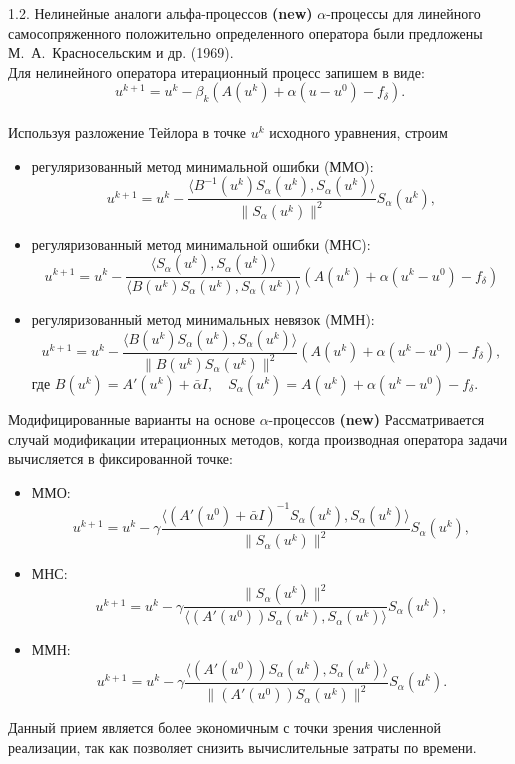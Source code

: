 \documentclass[10pt,pdf, mathserif, hyperref={unicode}]{beamer}
\begin{document}
\begin{frame}{1.2. Нелинейные аналоги альфа-процессов \textbf{(new)}}
	$\alpha$-процессы для линейного  самосопряженного положительно определенного оператора  были предложены {\color{red}М.~А.~Красносельским и др. (1969)}. \\
	Для нелинейного оператора итерационный процесс запишем в виде:
	$$u^{k+1}=u^k-\beta_k(A(u^k)+\alpha(u-u^0)-f_{\delta}).$$ \\
	Используя разложение Тейлора в точке $u^k$ исходного уравнения, строим
	\begin{itemize}
		\item регуляризованный метод минимальной ошибки (ММО): $$u^{k+1} =u^k - \frac{\langle B^{-1}(u^k)S_\alpha(u^k), S_\alpha (u^k)\rangle}{\|S_\alpha(u^k)\|^2}S_\alpha(u^k),$$
		\item регуляризованный метод минимальной ошибки (МНС):
		$$u^{k+1} =u^k - \frac{\langle S_\alpha(u^k), S_\alpha (u^k)\rangle}{\langle B(u^k)S_\alpha(u^k), S_\alpha(u^k)\rangle}(A(u^k)+\alpha(u^k-u^0)-f_\delta)$$
		\item регуляризованный метод минимальных невязок (ММН):
		$$u^{k+1} =u^k - \frac{\langle B(u^k)S_\alpha(u^k), S_\alpha (u^k)\rangle}{\|B(u^k)S_\alpha(u^k)\|^2}(A(u^k)+\alpha(u^k-u^0)-f_\delta),$$
		где $B(u^k)=A'(u^k)+\bar{\alpha}I, \quad S_\alpha(u^k)=A(u^k)+\alpha(u^k-u^0)-f_\delta$.
	\end{itemize}
\end{frame}

\begin{frame}{ Модифицированные варианты на основе $\alpha$-процессов \textbf{(new)}}
	Рассматривается случай модификации итерационных методов, когда производная оператора задачи вычисляется 
        в фиксированной точке:
	\begin{itemize}
		\item ММО: $$u^{k+1}=u^k-\gamma\frac{\big\langle(A'(u^0)+\bar{\alpha}I)^{-1}S_\alpha(u^k),S_\alpha(u^k)\big\rangle}{\|S_\alpha(u^k)\|^2}S_\alpha(u^k),$$
		\item МНС:
		$$u^{k+1}=u^k-\gamma\frac{\|S_\alpha(u^k)\|^2}{\big\langle(A'(u^0))S_\alpha(u^k), S_\alpha(u^k)\big\rangle}S_\alpha(u^k),$$
		\item ММН:
		$$u^{k+1}=u^k-\gamma\frac{\big\langle(A'(u^0))S_\alpha(u^k), S_\alpha(u^k)\big\rangle}{\|(A'(u^0))S_\alpha(u^k)\|^2}S_\alpha(u^k).$$
	\end{itemize}
	
	\smallskip
	Данный прием является более экономичным с точки зрения численной реализации, так как позволяет снизить вычислительные затраты по времени.
\end{frame}
\end{document}
